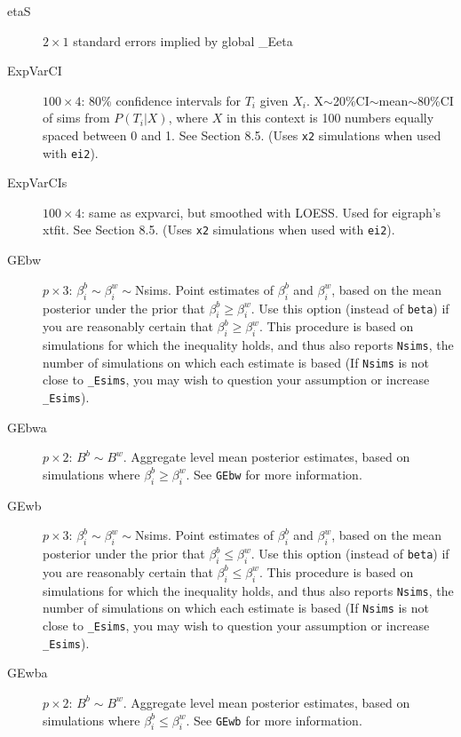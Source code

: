 \documentclass[11pt,titlepage]{article}
\begin{document}
\begin{description}
\item[etaS] $2\times 1$ standard errors implied by global \_Eeta

\item[ExpVarCI] $100\times 4$: 80\% confidence intervals for $T_i$
  given $X_i$.  X$\sim$20\%CI$\sim$mean$\sim$80\%CI of sims from
  $P(T_i|X)$, where $X$ in this context is 100 numbers equally spaced
  between 0 and 1.  See Section 8.5.  (Uses \texttt{x2} simulations
  when used with \texttt{ei2}).

\item[ExpVarCIs] $100\times 4$: same as expvarci, but smoothed with
  LOESS.  Used for eigraph's xtfit.  See Section 8.5.  (Uses
  \texttt{x2} simulations when used with \texttt{ei2}).

\item[GEbw] $p\times 3$: $\beta_i^b\sim\beta_i^w\sim$Nsims.  Point
  estimates of $\beta_i^b$ and $\beta_i^w$, based on the mean
  posterior under the prior that $\beta_i^b\geq\beta_i^w$.  Use this
  option (instead of \texttt{beta}) if you are reasonably certain that
  $\beta_i^b\geq\beta_i^w$.  This procedure is based on simulations for
  which the inequality holds, and thus also reports \texttt{Nsims},
  the number of simulations on which each estimate is based (If
  \texttt{Nsims} is not close to \texttt{\_Esims}, you may wish to
  question your assumption or increase \texttt{\_Esims}).

\item[GEbwa] $p\times 2$: $B^b\sim B^w$.  Aggregate level mean
  posterior estimates, based on simulations where
  $\beta_i^b\geq\beta_i^w$.  See \texttt{GEbw} for more information.

\item[GEwb] $p\times 3$: $\beta_i^b\sim\beta_i^w\sim$Nsims.  Point
  estimates of $\beta_i^b$ and $\beta_i^w$, based on the mean
  posterior under the prior that $\beta_i^b\leq\beta_i^w$.  Use this
  option (instead of \texttt{beta}) if you are reasonably certain that
  $\beta_i^b\leq\beta_i^w$.  This procedure is based on simulations for
  which the inequality holds, and thus also reports \texttt{Nsims},
  the number of simulations on which each estimate is based (If
  \texttt{Nsims} is not close to \texttt{\_Esims}, you may wish to
  question your assumption or increase \texttt{\_Esims}).

\item[GEwba] $p\times 2$: $B^b\sim B^w$.  Aggregate level mean
  posterior estimates, based on simulations where
  $\beta_i^b\leq\beta_i^w$.  See \texttt{GEwb} for more information.


\end{description}
\end{document}
